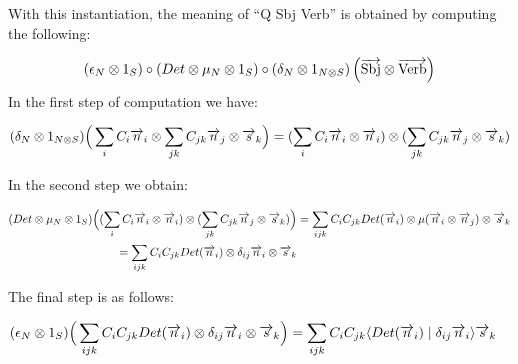With this instantiation, the  meaning of ``Q Sbj Verb'' is obtained by computing the following:

\[
(\epsilon_N \otimes 1_S) \circ (Det \otimes  \mu_N \otimes 1_S) \circ (\delta_N \otimes 1_{N \otimes S})\left(\overrightarrow{\text{Sbj}} \otimes \overrightarrow{\text{Verb}}\right)
\]
In the first step of computation we have:

\begin{align*}
(\delta_N \otimes 1_{N \otimes S})\Big(\sum_i C_i \overrightarrow{n}_i \otimes \sum_{jk} C_{jk} \overrightarrow{n}_j \otimes \overrightarrow{s}_k\Big) = 
(\sum_i C_i \overrightarrow{n}_i \otimes \overrightarrow{n}_i) \otimes  (\sum_{jk} C_{jk} \overrightarrow{n}_j \otimes \overrightarrow{s}_k)
\end{align*}

\noindent
In the second step we obtain: 

\begin{align*}
(Det \otimes  \mu_N \otimes 1_S)\Big((\sum_i C_i \overrightarrow{n}_i \otimes \overrightarrow{n}_i) \otimes  (\sum_{jk} C_{jk} \overrightarrow{n}_j \otimes \overrightarrow{s}_k)\Big) &= 
\sum_{ijk} C_i C_{jk} Det(\overrightarrow{n}_i) \otimes \mu(\overrightarrow{n}_i \otimes \overrightarrow{n}_j) \otimes \overrightarrow{s}_k \\
= \sum_{ijk} C_i C_{jk} Det(\overrightarrow{n}_i) \otimes \delta_{ij} \overrightarrow{n}_i \otimes \overrightarrow{s}_k&
\end{align*}

\noindent
The final step is as follows:

\begin{align*}
(\epsilon_{N} \otimes 1_S)  \Big(\sum_{ijk} C_i C_{jk} Det(\overrightarrow{n}_i) \otimes \delta_{ij} \overrightarrow{n}_i \otimes \overrightarrow{s}_k \Big) &=   
\sum_{ijk} C_i C_{jk} \langle Det(\overrightarrow{n}_i) \mid \delta_{ij} \overrightarrow{n}_i \rangle \overrightarrow{s}_k
\end{align*}

